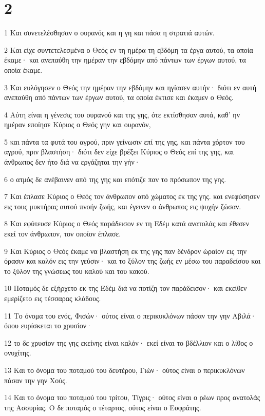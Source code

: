 \chapter{2}

\par 1 Και συνετελέσθησαν ο ουρανός και η γη και πάσα η στρατιά αυτών.
\par 2 Και είχε συντετελεσμένα ο Θεός εν τη ημέρα τη εβδόμη τα έργα αυτού, τα οποία έκαμε· και ανεπαύθη την ημέραν την εβδόμην από πάντων των έργων αυτού, τα οποία έκαμε.
\par 3 Και ευλόγησεν ο Θεός την ημέραν την εβδόμην και ηγίασεν αυτήν· διότι εν αυτή ανεπαύθη από πάντων των έργων αυτού, τα οποία έκτισε και έκαμεν ο Θεός.
\par 4 Αύτη είναι η γένεσις του ουρανού και της γης, ότε εκτίσθησαν αυτά, καθ' ην ημέραν εποίησε Κύριος ο Θεός γην και ουρανόν,
\par 5 και πάντα τα φυτά του αγρού, πριν γείνωσιν επί της γης, και πάντα χόρτον του αγρού, πριν βλαστήση· διότι δεν είχε βρέξει Κύριος ο Θεός επί της γης, και άνθρωπος δεν ήτο διά να εργάζηται την γήν·
\par 6 ο ατμός δε ανέβαινεν από της γης και επότιζε παν το πρόσωπον της γης.
\par 7 Και έπλασε Κύριος ο Θεός τον άνθρωπον από χώματος εκ της γης. και ενεφύσησεν εις τους μυκτήρας αυτού πνοήν ζωής, και έγεινεν ο άνθρωπος εις ψυχήν ζώσαν.
\par 8 Και εφύτευσε Κύριος ο Θεός παράδεισον εν τη Εδέμ κατά ανατολάς και έθεσεν εκεί τον άνθρωπον, τον οποίον έπλασε.
\par 9 Και Κύριος ο Θεός έκαμε να βλαστήση εκ της γης παν δένδρον ώραίον εις την όρασιν και καλόν εις την γεύσιν· και το ξύλον της ζωής εν μέσω του παραδείσου και το ξύλον της γνώσεως του καλού και του κακού.
\par 10 Ποταμός δε εξήρχετο εκ της Εδέμ διά να ποτίζη τον παράδεισον· και εκείθεν εμερίζετο εις τέσσαρας κλάδους.
\par 11 Το όνομα του ενός, Φισών· ούτος είναι ο περικυκλόνων πάσαν την γην Αβιλά· όπου ευρίσκεται το χρυσίον·
\par 12 το δε χρυσίον της γης εκείνης είναι καλόν· εκεί είναι το βδέλλιον και ο λίθος ο ονυχίτης.
\par 13 Και το όνομα του ποταμού του δευτέρου, Γιών· ούτος είναι ο περικυκλόνων πάσαν την γην Χούς.
\par 14 Και το όνομα του ποταμού του τρίτου, Τίγρις· ούτος είναι ο ρέων προς ανατολάς της Ασσυρίας. Ο δε ποταμός ο τέταρτος, ούτος είναι ο Ευφράτης.
